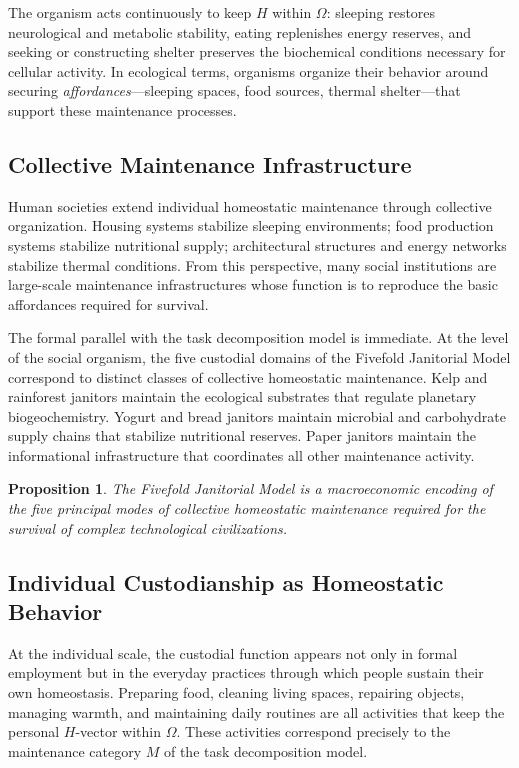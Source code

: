 \documentclass[12pt,a4paper]{article}
\theoremstyle{plain}
\newtheorem{proposition}[theorem]{Proposition}
\theoremstyle{definition}
\theoremstyle{remark}
\begin{document}
The organism acts continuously to keep $H$ within $\Omega$: sleeping
restores neurological and metabolic stability, eating replenishes energy
reserves, and seeking or constructing shelter preserves the biochemical
conditions necessary for cellular activity.  In ecological terms,
organisms organize their behavior around securing \emph{affordances}---sleeping
spaces, food sources, thermal shelter---that support these maintenance
processes.

\subsection{Collective Maintenance Infrastructure}

Human societies extend individual homeostatic maintenance through collective
organization.  Housing systems stabilize sleeping environments; food
production systems stabilize nutritional supply; architectural structures
and energy networks stabilize thermal conditions.  From this perspective,
many social institutions are large-scale maintenance infrastructures whose
function is to reproduce the basic affordances required for survival.

The formal parallel with the task decomposition model is immediate.  At
the level of the social organism, the five custodial domains of the Fivefold
Janitorial Model correspond to distinct classes of collective homeostatic
maintenance.  Kelp and rainforest janitors maintain the ecological substrates
that regulate planetary biogeochemistry.  Yogurt and bread janitors maintain
microbial and carbohydrate supply chains that stabilize nutritional reserves.
Paper janitors maintain the informational infrastructure that coordinates all
other maintenance activity.

\begin{proposition}
The Fivefold Janitorial Model is a macroeconomic encoding of the five
principal modes of collective homeostatic maintenance required for the
survival of complex technological civilizations.
\end{proposition}

\subsection{Individual Custodianship as Homeostatic Behavior}

At the individual scale, the custodial function appears not only in formal
employment but in the everyday practices through which people sustain their
own homeostasis.  Preparing food, cleaning living spaces, repairing
objects, managing warmth, and maintaining daily routines are all activities
that keep the personal $H$-vector within $\Omega$.  These activities
correspond precisely to the maintenance category $M$ of the task
decomposition model.
\end{document}
